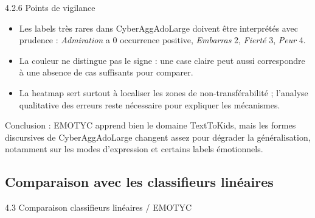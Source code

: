 \documentclass[aspectratio=169,10pt,xcolor=table]{beamer}
\begin{document}
\begin{frame}{4.2.6 Points de vigilance}
  \begin{itemize}
    \item Les labels tr\`es rares dans CyberAggAdoLarge doivent \^etre interpr\'et\'es avec prudence : \textit{Admiration} a 0 occurrence positive, \textit{Embarras} 2, \textit{Fiert\'e} 3, \textit{Peur} 4.
    \item La couleur ne distingue pas le signe : une case claire peut aussi correspondre \`a une absence de cas suffisants pour comparer.
    \item La heatmap sert surtout \`a localiser les zones de non-transf\'erabilit\'e ; l'analyse qualitative des erreurs reste n\'ecessaire pour expliquer les m\'ecanismes.
  \end{itemize}

  \vspace{1em}
  \small
  Conclusion : EMOTYC apprend bien le domaine TextToKids, mais les formes discursives de CyberAggAdoLarge changent assez pour d\'egrader la g\'en\'eralisation, notamment sur les modes d'expression et certains labels \'emotionnels.
\end{frame}

\subsection{Comparaison avec les classifieurs linéaires}

\begin{frame}{4.3 Comparaison classifieurs linéaires / EMOTYC}
  \begin{center}
  \end{center}
\end{frame}
\end{document}
